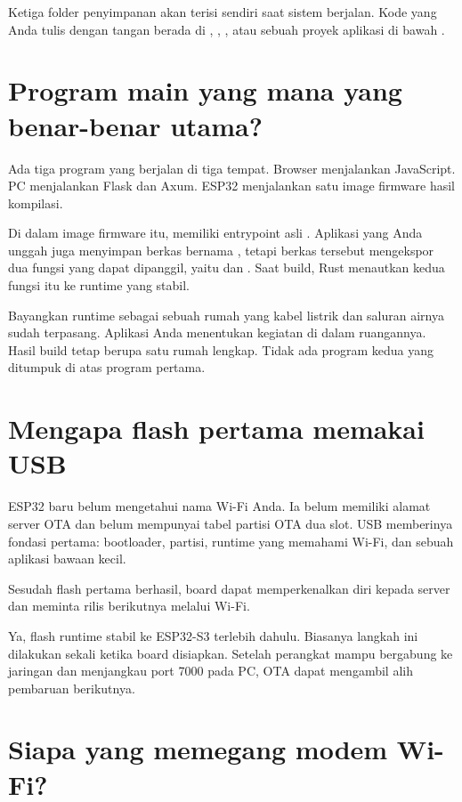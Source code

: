 Ketiga folder penyimpanan akan terisi sendiri saat sistem berjalan. Kode yang Anda tulis dengan tangan berada di , , , atau sebuah proyek aplikasi di bawah .

\section{Program main yang mana yang benar-benar utama?}

Ada tiga program yang berjalan di tiga tempat. Browser menjalankan JavaScript. PC menjalankan Flask dan Axum. ESP32 menjalankan satu image firmware hasil kompilasi.

Di dalam image firmware itu,  memiliki entrypoint asli . Aplikasi yang Anda unggah juga menyimpan berkas bernama , tetapi berkas tersebut mengekspor dua fungsi yang dapat dipanggil, yaitu  dan . Saat build, Rust menautkan kedua fungsi itu ke runtime yang stabil.

Bayangkan runtime sebagai sebuah rumah yang kabel listrik dan saluran airnya sudah terpasang. Aplikasi Anda menentukan kegiatan di dalam ruangannya. Hasil build tetap berupa satu rumah lengkap. Tidak ada program kedua yang ditumpuk di atas program pertama.

\section{Mengapa flash pertama memakai USB}

ESP32 baru belum mengetahui nama Wi-Fi Anda. Ia belum memiliki alamat server OTA dan belum mempunyai tabel partisi OTA dua slot. USB memberinya fondasi pertama: bootloader, partisi, runtime yang memahami Wi-Fi, dan sebuah aplikasi bawaan kecil.

Sesudah flash pertama berhasil, board dapat memperkenalkan diri kepada server dan meminta rilis berikutnya melalui Wi-Fi.

\begin{mentorbox}
Ya, flash runtime stabil ke ESP32-S3 terlebih dahulu. Biasanya langkah ini dilakukan sekali ketika board disiapkan. Setelah perangkat mampu bergabung ke jaringan dan menjangkau port 7000 pada PC, OTA dapat mengambil alih pembaruan berikutnya.
\end{mentorbox}

\section{Siapa yang memegang modem Wi-Fi?}

